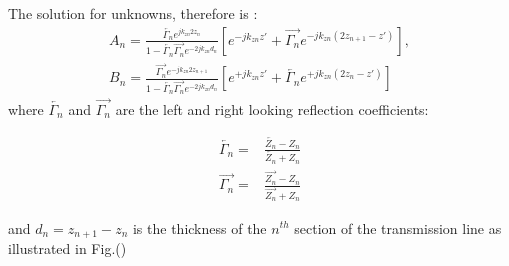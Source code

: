 \documentclass[11pt]{article}
\renewcommand{\^}{\hat}  %
\begin{document}
The solution for unknowns, therefore is \cite[p. 1178]{michalski2005electromagnetic}:
\begin{subequations}
  \begin{align}
    A_n = \frac{\overleftarrow{\Gamma_n} e^{j k_{zn} 2z_n }}
    {1-\overleftarrow{\Gamma_n} \overrightarrow{\Gamma_n} e^{-2j k_{zn} d_{n} }}
    \left[ e^{-j k_{zn} z'} + \overrightarrow{\Gamma_n} e^{-j k_{zn} (2z_{n+1} -z')} \right],\\
    B_n = \frac{\overrightarrow{\Gamma_n} e^{-j k_{zn} 2z_{n+1} }}
    {1-\overleftarrow{\Gamma_n} \overrightarrow{\Gamma_n} e^{-2j k_{zn} d_{n} }}
    \left[ e^{+j k_{zn} z'} + \overleftarrow{\Gamma_n} e^{+j k_{zn} (2z_n -z')} \right]
    \label{eq:AnB}
  \end{align}
\end{subequations}
where $\overleftarrow{\Gamma_n}$ and $\overrightarrow{\Gamma_n}$ are the left and right looking reflection coefficients:

\begin{subequations}
  \begin{align}
  \overleftarrow{\Gamma_n} ={}& \frac{\overleftarrow{Z_n} - Z_n}{\overleftarrow{Z_n} + Z_n}
    \label{eq:R_left}\\
    \overrightarrow{\Gamma_n} ={}& \frac{\overrightarrow{Z_n} - Z_n}{\overrightarrow{Z_n} + Z_n}
      \label{eq:R_right}
  \end{align}
  \label{eq:R}
\end{subequations}

and $d_n = z_{n+1} - z_n$ is the thickness of the $n^{th}$ section of the transmission line as illustrated in Fig.()






  \clearpage %
  
  
\end{document}
